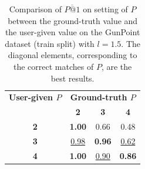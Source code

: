 \begin{table}[ht] %
\centering
\caption{Comparison of $\overline{P@1}$ on setting of $P$ between the ground-truth value and the user-given value on the GunPoint dataset (train split) with $l=1.5$. 
The diagonal elements, corresponding to the correct matches of $P$, are the best results.}
\label{tab:p_comparison}
\begin{tabular}{c|ccc}
\toprule
\textbf{User-given $P$} & \multicolumn{3}{c}{\textbf{Ground-truth $P$}} \\
& \textbf{2} & \textbf{3} & \textbf{4} \\
\midrule
\textbf{2} & \textbf{1.00} & 0.66 & 0.48 \\
\textbf{3} & \underline{0.98} & \textbf{0.96} & \underline{0.62} \\
\textbf{4} & \textbf{1.00} & \underline{0.90} & \textbf{0.86} \\
\bottomrule
\end{tabular}
\label{tab:comparison_p}
\end{table}